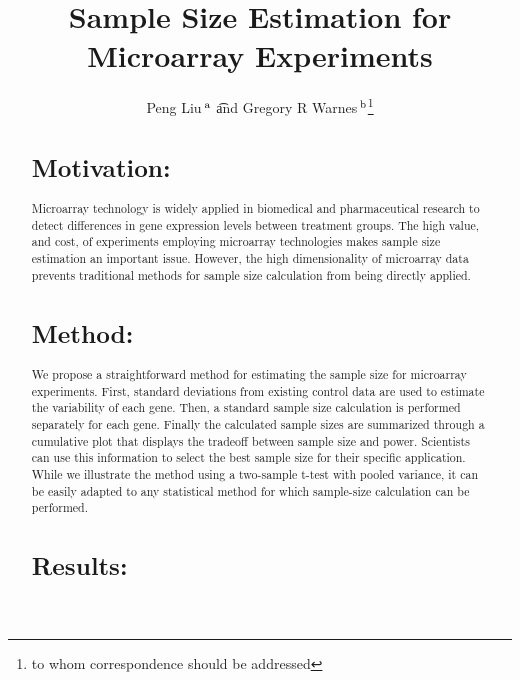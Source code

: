 \documentclass{bioinfo}
\begin{document}

\title{Sample Size Estimation for Microarray Experiments}
\author{
  Peng Liu\,$^{\rm a}$ \t
  and
  Gregory R Warnes\,$^{\rm b}$\footnote{to whom correspondence should
    be addressed}
}
\address{
  $^{\rm a}$Department of Biological Statistics and Computational
  Biology, Cornell University, Ithaca, NY 14853 \\
  $^{\rm b}$Nonclinical Statistics, Pfizer Global Research and Development,
  Groton, CT 06340
}

\maketitle

\begin{abstract}

\section{Motivation:}

Microarray technology is widely applied in biomedical and
pharmaceutical research to detect differences in gene expression
levels between treatment groups.  The high value, and cost, of
experiments employing microarray technologies makes sample size
estimation an important issue.  However, the high dimensionality of
microarray data prevents traditional methods for sample size
calculation from being directly applied.

\section{Method:}

We propose a straightforward method for estimating the sample size
for microarray experiments. First, standard deviations from
existing control data are used to estimate the variability of each
gene. Then, a standard sample size calculation is performed
separately for each gene.  Finally the calculated sample sizes are
summarized through a cumulative plot that displays the tradeoff
between sample size and power.  Scientists can use this
information to select the best sample size for their specific
application.  While we illustrate the method using a two-sample
t-test with pooled variance, it can be easily adapted to any
statistical method for which sample-size calculation can be
performed.

\section{Results:}


\end{abstract}
\end{document}
